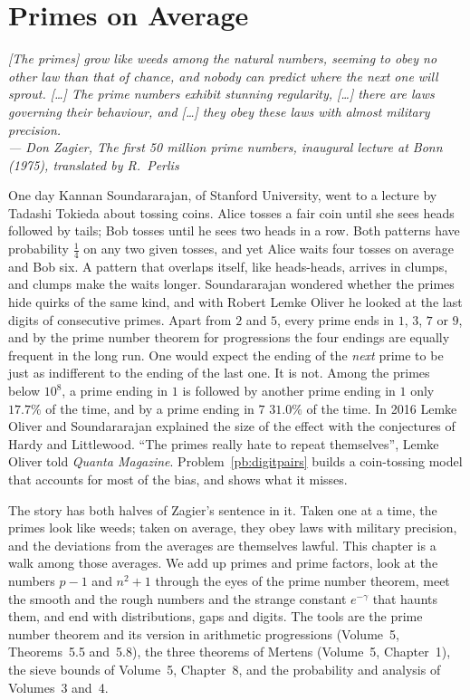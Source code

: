 \chapter{Primes on Average}

\begin{center}\itshape
[The primes] grow like weeds among the natural numbers, seeming to obey no other law than that of chance, and nobody can predict where the next one will sprout.
[\dots] The prime numbers exhibit stunning regularity, [\dots] there are laws governing their behaviour, and [\dots] they obey these laws with almost military precision.\\
\upshape --- Don Zagier, \emph{The first 50 million prime numbers}, inaugural lecture at Bonn (1975), translated by R.~Perlis
\end{center}

One day Kannan Soundararajan, of Stanford University, went to a lecture by Tadashi Tokieda about tossing coins. Alice tosses a fair coin until she sees heads followed by
tails; Bob tosses until he sees two heads in a row. Both patterns have probability $\frac14$ on any two given tosses, and yet Alice waits four tosses on average and Bob six.
A pattern that overlaps itself, like heads-heads, arrives in clumps, and clumps make the waits longer. Soundararajan wondered whether the primes hide quirks of the same kind,
and with Robert Lemke Oliver he looked at the last digits of consecutive primes. Apart from $2$ and $5$, every prime ends in $1$, $3$, $7$ or $9$, and by the prime
number theorem for progressions the four endings are equally frequent in the long run. One would expect the ending of the \emph{next} prime to be just as indifferent to the ending of the last one.
It is not. Among the primes below $10^8$, a prime ending in $1$ is followed by another prime ending in $1$ only $17.7\%$ of the time, and by a prime ending in $7$
$31.0\%$ of the time. In 2016 Lemke Oliver and Soundararajan explained the size of the effect with the conjectures of Hardy and Littlewood. ``The primes really hate
to repeat themselves'', Lemke Oliver told \emph{Quanta Magazine}. Problem~\ref{pb:digitpairs} builds a coin-tossing model that accounts for most of the bias, and shows
what it misses.

The story has both halves of Zagier's sentence in it. Taken one at a time, the primes look like weeds; taken on average, they obey laws with military precision, and the
deviations from the averages are themselves lawful. This chapter is a walk among those averages. We add up primes and prime factors, look at the numbers $p-1$ and
$n^2+1$ through the eyes of the prime number theorem, meet the smooth and the rough numbers and the strange constant $e^{-\gamma}$ that haunts them, and end with
distributions, gaps and digits. The tools are the prime number theorem and its version in arithmetic progressions (Volume~5, Theorems~5.5 and~5.8), the three theorems of
Mertens (Volume~5, Chapter~1), the sieve bounds of Volume~5, Chapter~8, and the probability and analysis of Volumes~3 and~4.

